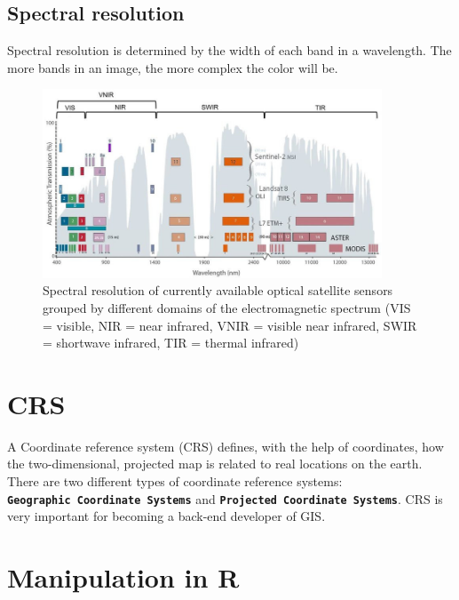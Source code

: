 \documentclass[
]{book}
\begin{document}
\hypertarget{spectral-resolution}{%
\subsection{\texorpdfstring{\textbf{Spectral resolution}\\
}{Spectral resolution }}\label{spectral-resolution}}

Spectral resolution is determined by the width of each band in a wavelength. The more bands in an image, the more complex the color will be.

\begin{figure}
\centering
\includegraphics[width=0.9\textwidth,height=\textheight]{images/Spectral-resolution.png}
\caption{Spectral resolution of currently available optical satellite sensors grouped by different domains of the electromagnetic spectrum (VIS = visible, NIR = near infrared, VNIR = visible near infrared, SWIR = shortwave infrared, TIR = thermal infrared)}
\end{figure}

\hypertarget{crs}{%
\section{CRS}\label{crs}}

A Coordinate reference system (CRS) defines, with the help of coordinates, how the two-dimensional, projected map is related to real locations on the earth. There are two different types of coordinate reference systems: \textbf{\texttt{Geographic\ Coordinate\ Systems}} and \textbf{\texttt{Projected\ Coordinate\ Systems}}. CRS is very important for becoming a back-end developer of GIS.

\hypertarget{manipulation-in-r}{%
\section{Manipulation in R}\label{manipulation-in-r}}
\end{document}
